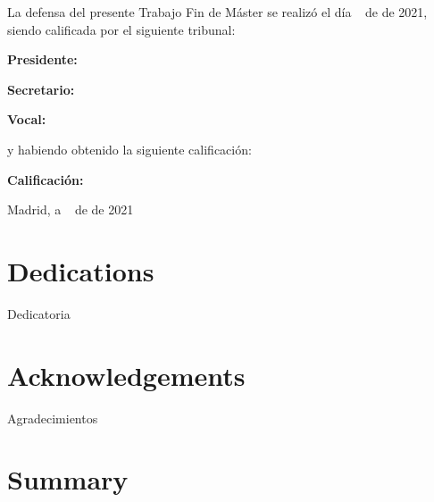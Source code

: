 \documentclass[a4paper, 12pt]{book}
\begin{document}
\vspace{1cm}
La defensa del presente Trabajo Fin de Máster se realizó el día \qquad$\;\,$ de \qquad\qquad\qquad\qquad \newline de 2021, siendo calificada por el siguiente tribunal:


\vspace{0.5cm}
\textbf{Presidente:}

\vspace{1.2cm}
\textbf{Secretario:}

\vspace{1.2cm}
\textbf{Vocal:}


\vspace{1.2cm}
y habiendo obtenido la siguiente calificación:

\vspace{1cm}
\textbf{Calificación:}


\vspace{1cm}
\begin{flushright}
Madrid, a \qquad$\;\,$ de \qquad\qquad\qquad\qquad de 2021
\end{flushright}


\chapter*{Dedications}
\begin{flushright}

Dedicatoria

\end{flushright}

\chapter*{Acknowledgements}

Agradecimientos

\chapter*{Summary}
\end{document}
